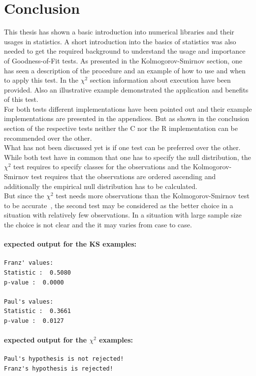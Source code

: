 \documentclass{article}
\theoremstyle{definition}
\begin{document}
\section{Conclusion}
This thesis has shown a basic introduction into numerical libraries and their usages in statistics.
A short introduction into the basics of statistics was also needed to get the required background to understand the usage and importance of Goodness-of-Fit tests.
As presented in the Kolmogorov-Smirnov section, one has seen a description of the procedure and an example of how to use and when to apply this test.
In the $\chi^2$ section information about execution have been provided.
Also an illustrative example demonstrated the application and benefits of this test.
\\
For both tests different implementations have been pointed out and their example implementations are presented in the appendices.
But as shown in the conclusion section of the respective tests neither the C nor the R implementation can be recommended over the other.
\\
What has not been discussed yet is if one test can be preferred over the other.
\\
While both test have in common that one has to specify the null distribution, the $\chi^2$ test requires to specify classes for the observations and the Kolmogorov-Smirnov test requires that the observations are ordered ascending and additionally the empirical null distribution has to be calculated.
\\
But since the $\chi^2$ test needs more observations than the Kolmogorov-Smirnov test to be accurate~\cite{knuth2001art}, the second test may be considered as the better choice in a situation with relatively few observations.
In a situation with large sample size the choice is not clear and the it may varies from case to case.
\newpage
\nocite{*}



\begin{appendices}


\paragraph{expected output for the KS examples:}
\begin{verbatim}
Franz' values:
Statistic :  0.5080
p-value :  0.0000

Paul's values:
Statistic :  0.3661
p-value :  0.0127
\end{verbatim}


\paragraph{expected output for the $\chi^2$ examples:}
\begin{verbatim}
Paul's hypothesis is not rejected!
Franz's hypothesis is rejected!
\end{verbatim}
\end{appendices}
\end{document}

